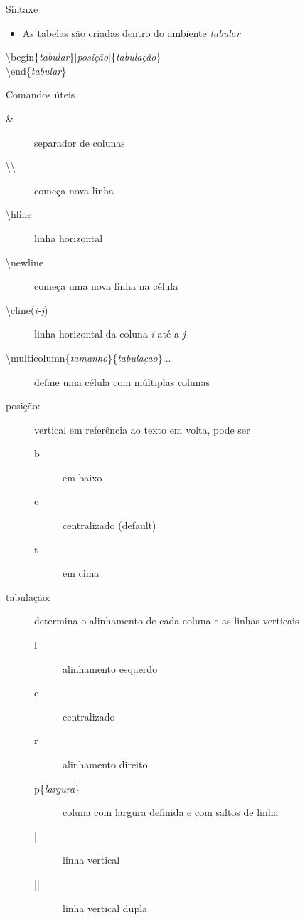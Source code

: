 \begin{frame}[allowframebreaks]{Sintaxe}
    \begin{itemize}
    \item As tabelas são criadas dentro do ambiente \textit{tabular}
    \end{itemize}

    \alert{\textbackslash begin\{\textit{tabular}\}[\textit{posição}]\{\textit{tabulação}\} \\
           \textbackslash end\{\textit{tabular}\}
          }

    \begin{block}{Comandos úteis}
        \begin{description}
        \item[\&] separador de colunas
        \item[\textbackslash\textbackslash] começa nova linha
        \item[\textbackslash hline] linha horizontal
        \item[\textbackslash newline] começa uma nova linha na célula
        \item[\textbackslash cline(\textit{i-j})] linha horizontal da coluna \textit{i} até a \textit{j}
        \item[\textbackslash multicolumn\{\textit{tamanho}\}\{\textit{tabulaçao}\}{...}] define uma célula com múltiplas colunas
        \end{description}
    \end{block}

    \newpage
    
    \begin{description}
    \item[posição:] vertical em referência ao texto em volta, pode ser
        \begin{description}
        \item[b] em baixo
        \item[c] centralizado (default)
        \item[t] em cima
        \end{description}
    \item[tabulação:] determina o alinhamento de cada coluna e as linhas verticais
        \begin{description}
        \item[l] alinhamento esquerdo
        \item[c] centralizado
        \item[r] alinhamento direito
        \item[p\{\textit{largura}\}] coluna com largura definida e com saltos de linha
        \item[|] linha vertical
        \item[||] linha vertical dupla
        \end{description}
    \end{description}
\end{frame}

